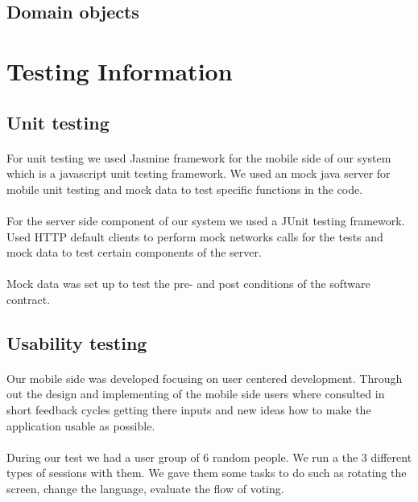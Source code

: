 \documentclass[10pt,a4paper]{article}
\begin{document}
\subsection{Domain objects}
\section{Testing Information}
\subsection{Unit testing}
\paragraph{}For unit testing we used Jasmine framework for the mobile side of our system which is a javascript unit testing framework. We used an mock java server for mobile unit testing and mock data to test specific functions in the code.
\paragraph{} For the server side component of our system we used a JUnit testing framework. Used HTTP default clients to perform mock networks calls for the tests and mock data to test certain components of the server.
\paragraph{}Mock data was set up to test the pre- and post conditions of the software contract.
\subsection{Usability testing}
\paragraph{}Our mobile side was developed focusing on user centered development. Through out the design and implementing of the mobile side users where consulted in short feedback cycles getting there inputs and new ideas how to make the application usable as possible.
\paragraph{}
During our test we had a user group of 6 random people. We run a the 3 different types of sessions with them. We gave them some tasks to do such as rotating the screen, change the language, evaluate the flow of voting. 
\end{document}
